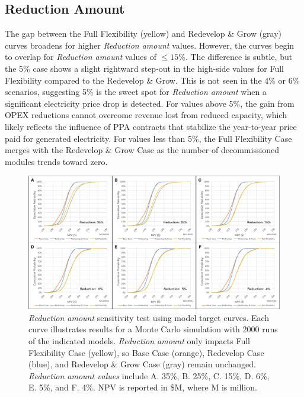 \subsection{Reduction Amount}\label{ch6:sens_redamt}
The gap between the Full Flexibility (yellow) and Redevelop \& Grow (gray) curves broadens for higher \textit{Reduction amount} values. However, the curves begin to overlap for \textit{Reduction amount} values of $\leq{15}\%$. The difference is subtle, but the 5\% case shows a slight rightward step-out in the high-side values for Full Flexibility compared to the Redevelop \& Grow. This is not seen in the 4\% or 6\% scenarios, suggesting 5\% is the sweet spot for \textit{Reduction amount} when a significant electricity price drop is detected. For values above 5\%, the gain from OPEX reductions cannot overcome revenue lost from reduced capacity, which likely reflects the influence of PPA contracts that stabilize the year-to-year price paid for generated electricity. For values less than 5\%, the Full Flexibility Case merges with the Redevelop \& Grow Case as the number of decommissioned modules trends toward zero.

\begin{figure}[!htp]
\centering
\includegraphics[width=.98\textwidth]{templates/images/Figure-Sensitivity_Reduction.pdf.png}
\caption[Reduction Amount sensitivity test]{\textit{Reduction amount} sensitivity test using model target curves. Each curve illustrates results for a Monte Carlo simulation with 2000 runs of the indicated models. \textit{Reduction amount} only impacts Full Flexibility Case (yellow), so Base Case (orange), Redevelop Case (blue), and Redevelop \& Grow Case (gray) remain unchanged. \textit{Reduction amount values} include A. 35\%, B. 25\%, C. 15\%, D. 6\%, E. 5\%, and F. 4\%. NPV is reported in \$M, where M is million.}
\label{fig:sens_test_reduction}
\end{figure}

